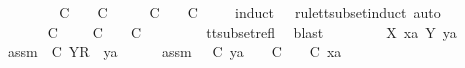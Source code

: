 \begin{isabellebody}
%
\isadelimproof
%
\endisadelimproof
%
\isatagproof
{}\isamarkupfalse%
\ {\isacharminus}\isanewline
\ \ \isamarkupfalse%
\ {\isachardoublequoteopen}{\isasymAnd}\ {\isasymsigma}{\isacharprime}{\isachardot}\ {\isasymsigma}{\isacharprime}\ {\isasymle}\isactrlsub C\ {\isasymsigma}\ {\isasymLongrightarrow}\ {\isasymrho}\ {\isasymsubseteq}\isactrlsub C\ {\isasymsigma}\ {\isasymLongrightarrow}\ {\isasymexists}\ {\isasymrho}{\isacharprime}{\isachardot}\ {\isasymrho}{\isacharprime}\ {\isasymsubseteq}\isactrlsub C\ {\isasymsigma}{\isacharprime}\ {\isasymand}\ {\isasymrho}{\isacharprime}\ {\isasymle}\isactrlsub C\ {\isasymrho}{\isachardoublequoteclose}\isanewline
\ \ \isamarkupfalse%
\ {\isacharparenleft}induct\ {\isasymrho}\ {\isasymsigma}\ rule{\isacharcolon}tt{\isacharunderscore}subset{\isachardot}induct{\isacharcomma}\ auto{\isacharparenright}\isanewline
\ \ \ \ \isamarkupfalse%
\ {\isasymsigma}{\isacharprime}\isanewline
\ \ \ \ \isamarkupfalse%
\ {\isachardoublequoteopen}{\isasymsigma}{\isacharprime}\ {\isasymle}\isactrlsub C\ {\isacharbrackleft}{\isacharbrackright}\ {\isasymLongrightarrow}\ {\isasymexists}{\isasymrho}{\isacharprime}{\isachardot}\ {\isasymrho}{\isacharprime}\ {\isasymsubseteq}\isactrlsub C\ {\isasymsigma}{\isacharprime}\ {\isasymand}\ {\isasymrho}{\isacharprime}\ {\isasymle}\isactrlsub C\ {\isacharbrackleft}{\isacharbrackright}{\isachardoublequoteclose}\isanewline
\ \ \ \ \ \ \isamarkupfalse%
\ tt{\isacharunderscore}subset{\isacharunderscore}refl\ \isamarkupfalse%
\ blast\isanewline
\ \ \isamarkupfalse%
\isanewline
\ \ \ \ \isamarkupfalse%
\ X\ xa\ Y\ ya\ {\isasymsigma}{\isacharprime}\isanewline
\ \ \ \ \isamarkupfalse%
\ assm{}{\isacharcolon}\ {\isachardoublequoteopen}{\isasymsigma}{\isacharprime}\ {\isasymle}\isactrlsub C\ {\isacharbrackleft}Y{\isacharbrackright}\isactrlsub R\ {\isacharhash}\ ya{\isachardoublequoteclose}\isanewline
\ \ \ \ \isamarkupfalse%
\ assm{}{\isacharcolon}\ {\isachardoublequoteopen}{\isacharparenleft}{\isasymAnd}{\isasymsigma}{\isacharprime}{\isachardot}\ {\isasymsigma}{\isacharprime}\ {\isasymle}\isactrlsub C\ ya\ {\isasymLongrightarrow}\ {\isasymexists}{\isasymrho}{\isacharprime}{\isachardot}\ {\isasymrho}{\isacharprime}\ {\isasymsubseteq}\isactrlsub C\ {\isasymsigma}{\isacharprime}\ {\isasymand}\ {\isasymrho}{\isacharprime}\ {\isasymle}\isactrlsub C\ xa{\isacharparenright}{\isachardoublequoteclose}\isanewline

\end{isabellebody}

